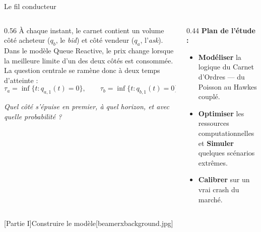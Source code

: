 \documentclass[10pt,aspectratio=169]{beamer}
\newcommand{\taua}{\tau_a}
\newcommand{\taub}{\tau_b}
\begin{document}
\begin{frame}{Le fil conducteur}
\begin{columns}[T]
\begin{column}{0.56\textwidth}
À chaque instant, le carnet contient un volume côté acheteur ($q_b$, le \emph{bid}) et côté vendeur ($q_a$, l'\emph{ask}). Dans le modèle Queue Reactive, le prix change lorsque la meilleure limite d'un des deux côtés est consommée.\\[1ex]

La question centrale se ramène donc à deux temps d'atteinte :
\[
  \taua=\inf\{t: q_{a,1}(t)=0\},\qquad \taub=\inf\{t: q_{b,1}(t)=0\}.
\]

\emph{Quel côté s'épuise en premier, à quel horizon, et avec quelle probabilité ?}
\end{column}
\begin{column}{0.44\textwidth}
\textbf{Plan de l'étude :}
\begin{itemize}
\item[\textbf{I.}] \textbf{Modéliser} la logique du Carnet d'Ordres — du Poisson au Hawkes couplé.
\item[\textbf{II.}] \textbf{Optimiser} les ressources computationnelles et \textbf{Simuler} quelques scénarios extrêmes.
\item[\textbf{III.}] \textbf{Calibrer} sur un vrai crash du marché.
\end{itemize}
\end{column}
\end{columns}
\end{frame}

[Partie I]{Construire le modèle}[beamerxbackground.jpg]
\end{document}
